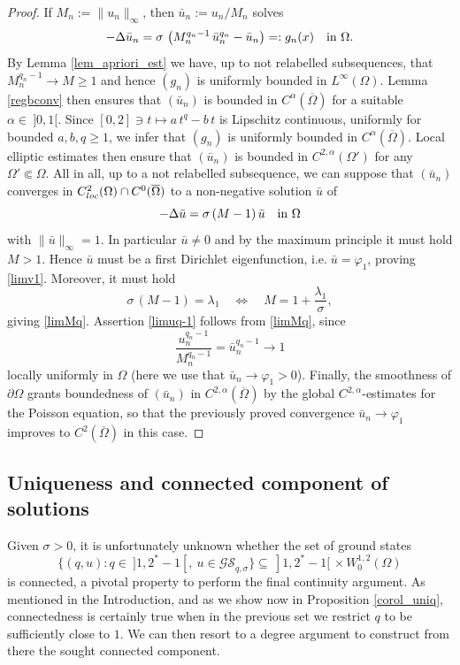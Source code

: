 \documentclass[12pt]{amsart}
\numberwithin{equation}{section}
\theoremstyle{plain}
\theoremstyle{plain}
\theoremstyle{plain}
\theoremstyle{definition}
\renewcommand{\ge}{\geqslant}
\begin{document}
 \begin{proof} 
If $M_n:=\|u_n\|_\infty$, then $\bar u_n:=u_n/M_n$ solves
\[
-\Delta \bar u_n=\sigma\, \left(M_n^{q_n-1}\, \bar u_n^{q_n}-\bar u_n\right)=:g_n(x) \quad \hbox{in $\Omega$}.
\]
 By Lemma \ref{lem_apriori_est} we have, up to not relabelled subsequences, that $M_n^{q_n-1}\to M\ge 1$ and hence $(g_n)$ is uniformly bounded in $L^\infty(\Omega)$. 
Lemma \ref{regbconv} then ensures that $(\bar u_n)$ is bounded in $C^\alpha(\overline\Omega)$ for a suitable $\alpha\in \ ]0, 1[$. 
Since $[0, 2]\ni t\mapsto a\, t^q-b\, t$ is Lipschitz continuous, uniformly for bounded $a, b, q\ge 1$, we infer that $(g_n)$ is uniformly bounded in $C^\alpha(\overline{\Omega})$. 
Local elliptic estimates then ensure that $(\bar u_n)$ is bounded in $C^{2, \alpha}(\Omega')$ for any $\Omega'\Subset\Omega$. 
All in all, up to a not relabelled subsequence, we can suppose that $(\bar u_n)$ converges in $C^2_{\rm loc}(\Omega)\cap C^0(\overline{\Omega})$ to a non-negative solution $\bar u$ of 
 \[
 -\Delta \bar u=\sigma\, (M-1)\, \bar u \quad \hbox{in $\Omega$}
 \]
 with $\|\bar u\|_\infty=1$. In particular $\bar u\ne 0$ and by the maximum principle it must hold $M>1$. 
Hence $\bar u$ must be a first Dirichlet eigenfunction, i.e.$\;$$\bar u=\varphi_1$, proving \eqref{limv1}. 
Moreover, it must hold
 \[
 \sigma\, (M-1)=\lambda_1\quad \Longleftrightarrow\quad M=1+\frac{\lambda_1}{\sigma},
 \]
 giving \eqref{limMq}.
Assertion \eqref{limuq-1} follows from \eqref{limMq}, since 
 \[
 \frac{u_n^{q_n-1}}{M_n^{q_n-1}}=\bar u_n^{q_n-1}\to 1
 \]
 locally uniformly in $\Omega$ (here we use that $\bar u_n \to\varphi_1>0$). 
Finally, the smoothness of $\partial\Omega$ grants boundedness of $(\bar u_n)$ in $C^{2, \alpha}(\overline{\Omega})$ by the global $C^{2, \alpha}$-estimates for the Poisson equation, so that the previously proved convergence $\bar u_n\to \varphi_1$ improves to $C^2(\overline{\Omega})$ in this case.
\end{proof}


\subsection{Uniqueness and connected component of solutions}
\label{sec_uniq_conn}

 Given $\sigma>0$, it is unfortunately unknown whether the set of ground states 
 \[
 \big\{(q, u): q\in\ ]1, 2^*-1[, \ u\in \mathcal{GS}_{q, \sigma}\big\}\subseteq \ ]1, 2^*-1[\,\times W^{1,2}_0(\Omega)
 \]
is connected, a pivotal property to perform the final continuity argument. 
As mentioned in the Introduction, and as we show now in Proposition \ref{corol_uniq}, connectedness is certainly true when in the previous set we restrict $q$ to be sufficiently close to $1$. We can then resort to a degree argument to construct from there the sought connected component. 
\end{document}
